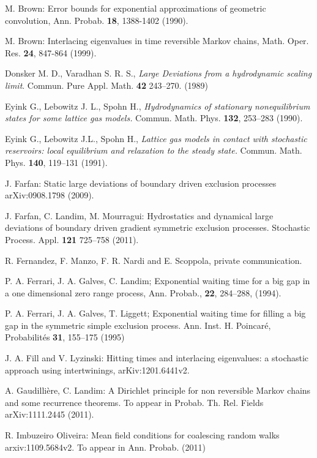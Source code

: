 \documentclass[reqno]{amsart}
\begin{document}
\begin{thebibliography}{99}
 M. Brown: Error bounds for exponential approximations of
  geometric convolution, Ann. Probab. {\bf 18}, 1388-1402 (1990).

 M. Brown: Interlacing eigenvalues in time reversible
  Markov chains, Math. Oper. Res. {\bf 24}, 847-864 (1999).

 Donsker M. D., Varadhan S. R. S., \emph{Large Deviations
    from a hydrodynamic scaling limit}.  Commun. Pure Appl. Math. {\bf
    42} 243--270. (1989)

 Eyink G., Lebowitz J. L., Spohn H., \emph{Hydrodynamics
    of stationary nonequilibrium states for some lattice gas models.}
  Commun. Math. Phys. {\bf 132}, 253--283 (1990).

 Eyink G., Lebowitz J.L., Spohn H., \emph{Lattice gas
    models in contact with stochastic reservoirs: local equilibrium
    and relaxation to the steady state.}  Commun. Math. Phys. {\bf
    140}, 119--131 (1991).

 J. Farfan: Static large deviations of boundary driven
  exclusion processes arXiv:0908.1798 (2009).

 J. Farfan, C. Landim, M. Mourragui: Hydrostatics and
  dynamical large deviations of boundary driven gradient symmetric
  exclusion processes. Stochastic Process. Appl. {\bf 121} 725--758
  (2011).

 R. Fernandez, F. Manzo, F. R. Nardi and E. Scoppola,
  private communication.

 P. A.  Ferrari, J. A. Galves, C. Landim; Exponential
  waiting time for a big gap in a one dimensional zero range
  process, Ann. Probab., {\bf 22}, 284--288, (1994).

 P. A.  Ferrari, J. A. Galves, T. Liggett; Exponential
  waiting time for filling a big gap in the symmetric simple exclusion
  process. Ann. Inst. H.  Poincar\'e, Probabilit\'es {\bf 31},
  155--175 (1995)

 J. A. Fill and V. Lyzinski: Hitting times and
  interlacing eigenvalues: a stochastic approach using
  intertwinings, arKiv:1201.6441v2.

 A. Gaudilli\`ere, C. Landim: A Dirichlet principle for
  non reversible Markov chains and some recurrence theorems.  To
  appear in Probab. Th. Rel. Fields arXiv:1111.2445 (2011).

 R. Imbuzeiro Oliveira: Mean field conditions for
  coalescing random walks arxiv:1109.5684v2. To appear in
  Ann. Probab. (2011)


\end{thebibliography}
\end{document}
